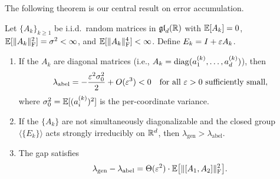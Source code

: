 The following theorem is our central result on error accumulation.

\begin{theorem}\label{thm:lyapunov}
Let $\{A_k\}_{k \ge 1}$ be i.i.d.\ random matrices in $\operatorname{\mathfrak{gl}}_d(\mathbb{R})$
with $\mathbb{E}[A_k] = 0$, $\mathbb{E}[\lVert A_k \rVert_{\mathrm{F}}^2] = \sigma^2 < \infty$,
and $\mathbb{E}[\lVert A_k \rVert_{\mathrm{F}}^4] < \infty$.  Define $E_k = I + \varepsilon A_k$.
\begin{enumerate}[label=\textup{(\alph*)}]
\item\label{item:diag}
  If the $A_k$ are diagonal matrices (i.e., $A_k = \operatorname{diag}(a_1^{(k)},
  \ldots, a_d^{(k)})$), then
  \begin{equation}\label{eq:lyap_abel}
    \lambda_{\mathrm{abel}} = -\frac{\varepsilon^2 \sigma_0^2}{2} + O(\varepsilon^3) < 0
    \quad \text{for all } \varepsilon > 0 \text{ sufficiently small},
  \end{equation}
  where $\sigma_0^2 = \mathbb{E}[(a_i^{(k)})^2]$ is the per-coordinate variance.

\item\label{item:general}
  If the $\{A_k\}$ are not simultaneously diagonalizable and the
  closed group $\langle \{E_k\} \rangle$ acts strongly irreducibly
  on $\mathbb{R}^d$, then
  $\lambda_{\mathrm{gen}} > \lambda_{\mathrm{abel}}$.

\item\label{item:gap}
  The gap satisfies
  \begin{equation}\label{eq:lyap_gap}
    \lambda_{\mathrm{gen}} - \lambda_{\mathrm{abel}}
    = \Theta(\varepsilon^2) \cdot \mathbb{E}\bigl[\lVert [A_1, A_2] \rVert_{\mathrm{F}}^2\bigr].
  \end{equation}
\end{enumerate}
\end{theorem}

